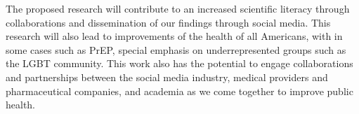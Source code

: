 The proposed research will contribute to an increased scientific literacy through collaborations and dissemination of our findings through social media. This research will also lead to improvements of the health of all Americans, with in some cases such as PrEP, special emphasis on underrepresented groups such as the LGBT community. This work also has the potential to engage collaborations and partnerships between the social media industry, medical providers and pharmaceutical companies, and academia as we come together to improve public health.
